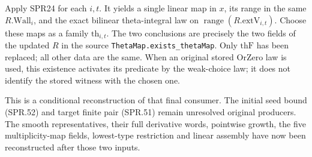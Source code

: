 Apply SPR24 for each \(i,t\).  It yields a single linear map in
\(x\), its range in the same \(R.\mathrm{Wall}_i\), and the
exact bilinear theta-integral law on
\(\operatorname{range}(R.\mathrm{extV}_{i,t})\).
Choose these maps as a family \(\mathrm{th}_{i,t}\).
The two conclusions are precisely the two fields of the updated
\(R\) in the source \texttt{ThetaMap.\allowbreak exists\_\allowbreak thetaMap}.
Only \(\mathrm{thF}\) has been replaced; all other data are the
same.  When an original stored \(\mathrm{OrZero}\) law is used,
this existence activates its predicate by the weak-choice law;
it does not identify the stored witness with the chosen one.

This is a conditional reconstruction of that final consumer.
The initial seed bound (SPR.52) and target finite pair (SPR.51)
remain unresolved original producers.  The smooth representatives,
their full derivative words, pointwise growth, the five
multiplicity-map fields, lowest-type restriction and linear
assembly have now been reconstructed after those two inputs.


